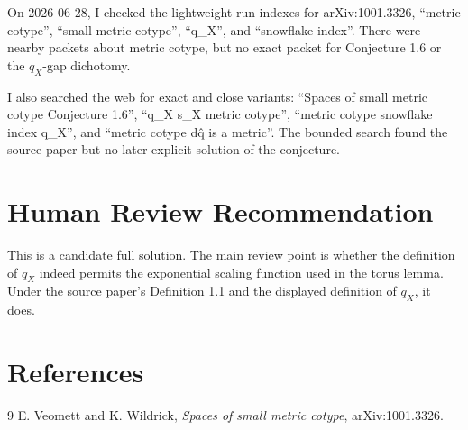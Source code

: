 \documentclass[11pt]{article}
\begin{document}
On 2026-06-28, I checked the lightweight run indexes for arXiv:1001.3326,
``metric cotype'', ``small metric cotype'', ``q\_X'', and ``snowflake index''.
There were nearby packets about metric cotype, but no exact packet for
Conjecture 1.6 or the \(q_X\)-gap dichotomy.

I also searched the web for exact and close variants:
``Spaces of small metric cotype Conjecture 1.6'', ``q\_X s\_X metric
cotype'', ``metric cotype snowflake index q\_X'', and ``metric cotype d\^q is
a metric''. The bounded search found the source paper but no later explicit
solution of the conjecture.

\section*{Human Review Recommendation}

This is a candidate full solution. The main review point is whether the
definition of \(q_X\) indeed permits the exponential scaling function used in
the torus lemma. Under the source paper's Definition 1.1 and the displayed
definition of \(q_X\), it does.

\section*{References}

\begin{thebibliography}{9}
E. Veomett and K. Wildrick,
\emph{Spaces of small metric cotype},
arXiv:1001.3326.
\end{thebibliography}
\end{document}

